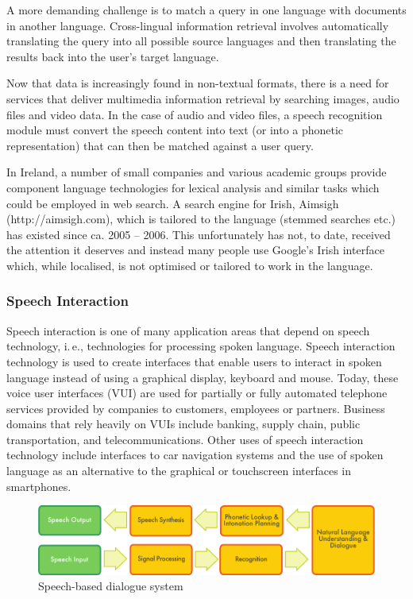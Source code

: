 \begin{multicols}{2}
A more demanding challenge is to match a query in one language with documents in another language. Cross-lingual information retrieval involves automatically translating the query into all possible source languages and then translating the results back into the user's target language.

Now that data is increasingly found in non-textual formats, there is a need for services that deliver multimedia information retrieval by searching images, audio files and video data. In the case of audio and video files, a speech recognition module must convert the speech content into text (or into a phonetic representation) that can then be matched against a user query.

In Ireland, a number of small companies and various academic groups provide component language technologies for lexical analysis and similar tasks which could be employed in web search. A search engine for Irish, Aimsigh (http://aimsigh.com), which is tailored to the language (stemmed searches etc.) has existed since ca. 2005 -- 2006. This unfortunately has not, to date, received the attention it deserves and instead many people use Google’s Irish interface which, while localised, is not optimised or tailored to work in the language.

\subsubsection{Speech Interaction}

Speech interaction is one of many application areas that depend on speech technology, i.\,e., technologies for processing spoken language. Speech interaction technology is used to create interfaces that enable users to interact in spoken language instead of using a graphical display, keyboard and mouse.  Today, these voice user interfaces (VUI) are used for partially or fully automated telephone services provided by companies to customers, employees or partners. Business domains that rely heavily on VUIs include banking, supply chain, public transportation, and telecommunications. Other uses of speech interaction technology include interfaces to car navigation systems and the use of spoken language as an alternative to the graphical or touchscreen interfaces in smartphones.

\begin{figure}[htb]
  \center
  \includegraphics[width=\textwidth]{../_media/english/simple_speech-based_dialogue_architecture}
  \caption{Speech-based dialogue system}
  \label{fig:dialoguearch_en}
\end{figure}


\end{multicols}
